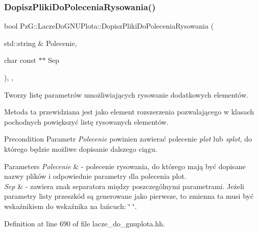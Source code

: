\subsubsection{\texorpdfstring{Dopisz\+Pliki\+Do\+Polecenia\+Rysowania()}{DopiszPlikiDoPoleceniaRysowania()}}
{\footnotesize\ttfamily bool Pz\+G\+::\+Lacze\+Do\+G\+N\+U\+Plota\+::\+Dopisz\+Pliki\+Do\+Polecenia\+Rysowania (\begin{DoxyParamCaption}\item[{std\+::string \&}]{Polecenie,  }\item[{char const $\ast$$\ast$}]{Sep }\end{DoxyParamCaption})\hspace{0.3cm}{\ttfamily [inline]}, {\ttfamily [protected]}, {\ttfamily [virtual]}}



Tworzy listę parametrów umożliwiających rysowanie dodatkowych elementów. 

Metoda ta przewidziana jest jako element rozszerzenia pozwalającego w klasach pochodnych powiększyć listę rysowanych elementów. \begin{DoxyPrecond}{Precondition}
Parametr {\itshape Polecenie} powinien zawierać polecenie {\itshape plot} lub {\itshape splot}, do którego będzie możliwe dopisanie dalszego ciągu. 
\end{DoxyPrecond}

\begin{DoxyParams}{Parameters}
{\em Polecenie} & -\/ polecenie rysowania, do którego mają być dopisane nazwy plików i odpowiednie parametry dla polecenia plot. \\
\hline
{\em Sep} & -\/ zawiera znak separatora między poszczególnymi parametrami. Jeżeli parametry listy przeszkód są generowane jako pierwsze, to zmienna ta musi być wskaźnikiem do wskaźnika na łańcuch\+: \char`\"{} \char`\"{}. \\
\hline
\end{DoxyParams}


Definition at line 690 of file lacze\+\_\+do\+\_\+gnuplota.\+hh.

\mbox{\label{class_pz_g_1_1_lacze_do_g_n_u_plota_ad3d7607946b82aa941d786dcd086d27e}} 
